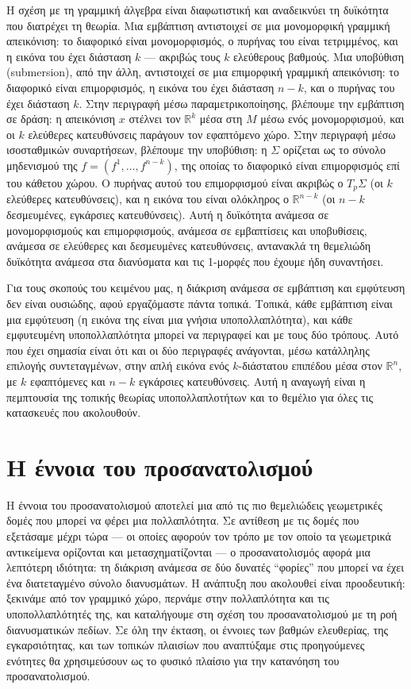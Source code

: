 \documentclass[11pt,a4paper,twoside,openright]{book}
\begin{document}
Η σχέση με τη γραμμική άλγεβρα είναι διαφωτιστική και αναδεικνύει τη δυϊκότητα που διατρέχει τη θεωρία. Μια εμβάπτιση αντιστοιχεί σε μια μονομορφική γραμμική απεικόνιση: το διαφορικό είναι μονομορφισμός, ο πυρήνας του είναι τετριμμένος, και η εικόνα του έχει διάσταση $k$ --- ακριβώς τους $k$ ελεύθερους βαθμούς. Μια υποβύθιση (submersion), από την άλλη, αντιστοιχεί σε μια επιμορφική γραμμική απεικόνιση: το διαφορικό είναι επιμορφισμός, η εικόνα του έχει διάσταση $n-k$, και ο πυρήνας του έχει διάσταση $k$. Στην περιγραφή μέσω παραμετρικοποίησης, βλέπουμε την εμβάπτιση σε δράση: η απεικόνιση $x$ στέλνει τον $\mathbb{R}^k$ μέσα στη $M$ μέσω ενός μονομορφισμού, και οι $k$ ελεύθερες κατευθύνσεις παράγουν τον εφαπτόμενο χώρο. Στην περιγραφή μέσω ισοσταθμικών συναρτήσεων, βλέπουμε την υποβύθιση: η $\Sigma$ ορίζεται ως το σύνολο μηδενισμού της $f = (f^1, \dots, f^{n-k})$, της οποίας το διαφορικό είναι επιμορφισμός επί του κάθετου χώρου. Ο πυρήνας αυτού του επιμορφισμού είναι ακριβώς ο $T_p\Sigma$ (οι $k$ ελεύθερες κατευθύνσεις), και η εικόνα του είναι ολόκληρος ο $\mathbb{R}^{n-k}$ (οι $n-k$ δεσμευμένες, εγκάρσιες κατευθύνσεις). Αυτή η δυϊκότητα ανάμεσα σε μονομορφισμούς και επιμορφισμούς, ανάμεσα σε εμβαπτίσεις και υποβυθίσεις, ανάμεσα σε ελεύθερες και δεσμευμένες κατευθύνσεις, αντανακλά τη θεμελιώδη δυϊκότητα ανάμεσα στα διανύσματα και τις 1-μορφές που έχουμε ήδη συναντήσει.

Για τους σκοπούς του κειμένου μας, η διάκριση ανάμεσα σε εμβάπτιση και εμφύτευση δεν είναι ουσιώδης, αφού εργαζόμαστε πάντα τοπικά. Τοπικά, κάθε εμβάπτιση είναι μια εμφύτευση (η εικόνα της είναι μια γνήσια υποπολλαπλότητα), και κάθε εμφυτευμένη υποπολλαπλότητα μπορεί να περιγραφεί και με τους δύο τρόπους. Αυτό που έχει σημασία είναι ότι και οι δύο περιγραφές ανάγονται, μέσω κατάλληλης επιλογής συντεταγμένων, στην απλή εικόνα ενός $k$-διάστατου επιπέδου μέσα στον $\mathbb{R}^n$, με $k$ εφαπτόμενες και $n-k$ εγκάρσιες κατευθύνσεις. Αυτή η αναγωγή είναι η πεμπτουσία της τοπικής θεωρίας υποπολλαπλοτήτων και το θεμέλιο για όλες τις κατασκευές που ακολουθούν.

\section{Η έννοια του προσανατολισμού}
	\label{sec:orientation}

Η έννοια του προσανατολισμού αποτελεί μια από τις πιο θεμελιώδεις γεωμετρικές δομές που μπορεί να φέρει μια πολλαπλότητα. Σε αντίθεση με τις δομές που εξετάσαμε μέχρι τώρα --- οι οποίες αφορούν τον τρόπο με τον οποίο τα γεωμετρικά αντικείμενα ορίζονται και μετασχηματίζονται --- ο προσανατολισμός αφορά μια λεπτότερη ιδιότητα: τη διάκριση ανάμεσα σε δύο δυνατές ``φορίες'' που μπορεί να έχει ένα διατεταγμένο σύνολο διανυσμάτων. Η ανάπτυξη που ακολουθεί είναι προοδευτική: ξεκινάμε από τον γραμμικό χώρο, περνάμε στην πολλαπλότητα και τις υποπολλαπλότητές της, και καταλήγουμε στη σχέση του προσανατολισμού με τη ροή διανυσματικών πεδίων. Σε όλη την έκταση, οι έννοιες των βαθμών ελευθερίας, της εγκαρσιότητας, και των τοπικών πλαισίων που αναπτύξαμε στις προηγούμενες ενότητες θα χρησιμεύσουν ως το φυσικό πλαίσιο για την κατανόηση του προσανατολισμού.
\end{document}
